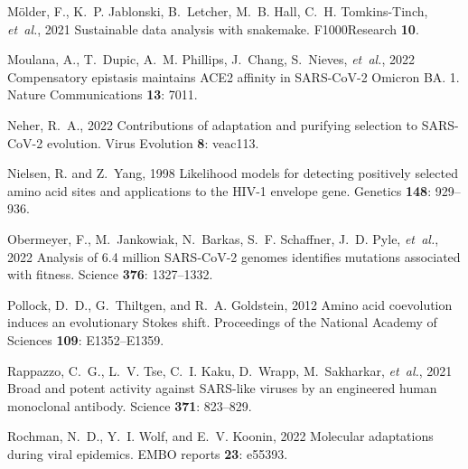 \documentclass[9pt,twocolumn,twoside]{gsajnl_modified}
\begin{document}
{\begin{thebibliography}{76}
{M{\"o}lder, F., K.~P. Jablonski, B.~Letcher, M.~B. Hall, C.~H. Tomkins-Tinch,
  {\em et~al.\/}}, 2021 Sustainable data analysis with snakemake. F1000Research
  {\bf 10}.

{Moulana, A., T.~Dupic, A.~M. Phillips, J.~Chang, S.~Nieves, {\em et~al.\/}},
  2022 {Compensatory epistasis maintains ACE2 affinity in SARS-CoV-2 Omicron
  BA. 1}. Nature Communications {\bf 13}: 7011.

{Neher, R.~A.}, 2022 Contributions of adaptation and purifying selection to
  {SARS-CoV-2} evolution. Virus Evolution {\bf 8}: veac113.

{Nielsen, R. {\rm and} Z.~Yang}, 1998 Likelihood models for detecting
  positively selected amino acid sites and applications to the {HIV-1} envelope
  gene. Genetics {\bf 148}: 929--936.

{Obermeyer, F., M.~Jankowiak, N.~Barkas, S.~F. Schaffner, J.~D. Pyle, {\em
  et~al.\/}}, 2022 Analysis of 6.4 million {SARS}-{CoV}-2 genomes identifies
  mutations associated with fitness. Science {\bf 376}: 1327--1332.

{Pollock, D.~D., G.~Thiltgen, {\rm and} R.~A. Goldstein}, 2012 Amino acid
  coevolution induces an evolutionary {Stokes} shift. Proceedings of the
  National Academy of Sciences {\bf 109}: E1352--E1359.

{Rappazzo, C.~G., L.~V. Tse, C.~I. Kaku, D.~Wrapp, M.~Sakharkar, {\em
  et~al.\/}}, 2021 Broad and potent activity against {SARS-like} viruses by an
  engineered human monoclonal antibody. Science {\bf 371}: 823--829.

{Rochman, N.~D., Y.~I. Wolf, {\rm and} E.~V. Koonin}, 2022 Molecular
  adaptations during viral epidemics. EMBO reports {\bf 23}: e55393.


\end{thebibliography}}
\end{document}
